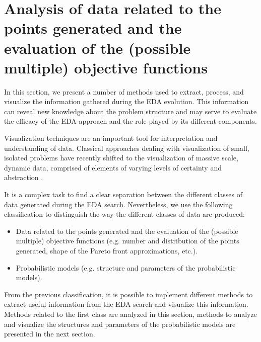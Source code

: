 \documentclass[a4paper]{article}
\begin{document}



\section{Analysis of data related to the points generated and the evaluation
of the (possible multiple) objective functions}


 In this section, we present a number of methods used to extract, process, and visualize the information gathered during the EDA evolution. This information can reveal  new knowledge about the problem structure and may serve to evaluate the efficacy of the EDA approach and the role played by its different components.

 Visualization techniques are an important tool for interpretation
 and understanding of data. Classical approaches dealing with
 visualization of small, isolated problems have recently shifted to
 the visualization of massive scale, dynamic data, comprised of
 elements of varying levels of certainty and abstraction
 \cite{Buerger_and_Hauser:2007,Thomas_and_Cook:2006}.

 It is a complex task to find a clear separation between the different
classes  of data generated during the EDA search. Nevertheless, we
use the following classification to distinguish the way the
different classes of data are produced:

\begin{itemize}
  \item Data related to the points generated and the evaluation of the (possible multiple)
  objective functions (e.g. number and distribution of the points generated, shape of the
  Pareto front approximations, etc.).
  \item Probabilistic models (e.g. structure and parameters of the probabilistic models).
\end{itemize}

 From the previous classification, it is possible to implement
different methods to extract useful information from the EDA search
and  visualize this information. Methods related to the first
class are analyzed in this section, methods to analyze and visualize
the structures and parameters of the probabilistic models are
presented in the next section.
\end{document}
